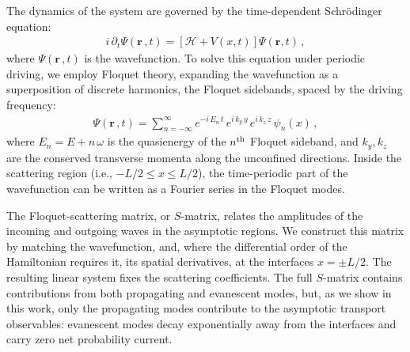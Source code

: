 \documentclass[aps,prb,onecolumn,longbibliography,nofootinbib,citeautoscript,10pt]{revtex4-2}
\begin{document}
The dynamics of the system are governed by the time-dependent Schr\"odinger equation:
\begin{align}
i\, \partial_{t}\Psi(\boldsymbol{r} \,, t) = \left[ \mathcal{H} + V(x,t) \right] \Psi(\boldsymbol{r} , t)\,,
\end{align}
where $\Psi(\boldsymbol{r} \,, t)$ is the wavefunction. To solve this equation under periodic driving, we employ Floquet theory, expanding the wavefunction as a superposition of discrete harmonics, the Floquet sidebands, spaced by the driving frequency:
\begin{align}
\Psi(\boldsymbol{r} \,, t) = \sum_{n=-\infty}^{\infty} e^{-i \,E_n \,t} 
	\, e^{i \,k_y \,y} \, e^{i \,k_z \,z}\, \psi_n(x)\,,
\end{align}
where $E_n = E + n\, \omega$ is the quasienergy of the $ n^{\rm th}$ Floquet sideband, and $k_y, k_z$ are the conserved transverse momenta along the unconfined directions. Inside the scattering region (i.e., $-L/2 \le x \le L/2$), the time-periodic part of the wavefunction can be written as a Fourier series in the Floquet modes.

The Floquet-scattering matrix, or $S$-matrix, relates the amplitudes of the incoming and outgoing waves in the asymptotic regions. We construct this matrix by matching the wavefunction, and, where the differential order of the Hamiltonian requires it, its spatial derivatives, at the interfaces $x = \pm L/2$. The resulting linear system fixes the scattering coefficients. The full $S$-matrix contains contributions from both propagating and evanescent modes, but, as we show in this work, only the propagating modes contribute to the asymptotic transport observables: evanescent modes decay exponentially away from the interfaces and carry zero net probability current.
\end{document}
